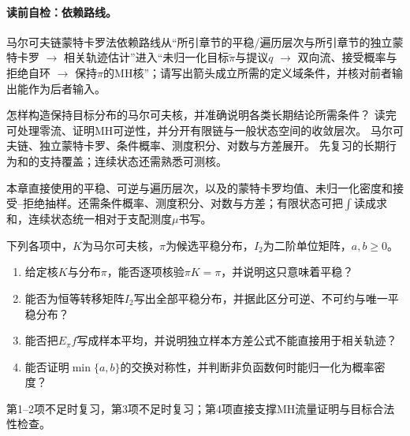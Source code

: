 \paragraph{读前自检：依赖路线。}马尔可夫链蒙特卡罗法依赖路线从“所引章节的平稳/遍历层次与所引章节的独立蒙特卡罗 $\to$ 相关轨迹估计”进入“未归一化目标$\widetilde\pi$与提议$q$ $\to$ 双向流、接受概率与拒绝自环 $\to$ 保持$\pi$的MH核”；请写出箭头成立所需的定义域条件，并核对前者输出能作为后者输入。\par

\begin{SLCompactOpeningSection}
{怎样构造保持目标分布的马尔可夫核，并准确说明各类长期结论所需条件？}
{读完可处理零流、证明MH可逆性，并分开有限链与一般状态空间的收敛层次。}
{马尔可夫链、独立蒙特卡罗、条件概率、测度积分、对数与方差展开。}
{先复习的长期行为和的支持覆盖；连续状态还需熟悉可测核。}
\label{struct:V5-C03-CH01}

\label{struct:V5-C03-CH02}
\begin{prerequisitebox}
本章直接使用的平稳、可逆与遍历层次，以及的蒙特卡罗均值、未归一化密度和接受--拒绝抽样。还需条件概率、测度积分、对数与方差；有限状态可把$\int$读成求和，连续状态统一相对于支配测度$\mu$书写。
\end{prerequisitebox}

\label{struct:V5-C03-CH03}
\begin{precheckbox}
下列各项中，$K$为马尔可夫核，$\pi$为候选平稳分布，$I_2$为二阶单位矩阵，$a,b\ge0$。
\begin{enumerate}[leftmargin=2.2em]
  \item 给定核$K$与分布$\pi$，能否逐项核验$\pi K=\pi$，并说明这只意味着平稳？
  \item 能否为恒等转移矩阵$I_2$写出全部平稳分布，并据此区分可逆、不可约与唯一平稳分布？
  \item 能否把$E_\pi f$写成样本平均，并说明独立样本方差公式不能直接用于相关轨迹？
  \item 能否证明$\min\{a,b\}$的交换对称性，并判断非负函数何时能归一化为概率密度？
\end{enumerate}
第1--2项不足时复习，第3项不足时复习；第4项直接支撑MH流量证明与目标合法性检查。
\end{precheckbox}


\end{SLCompactOpeningSection}
